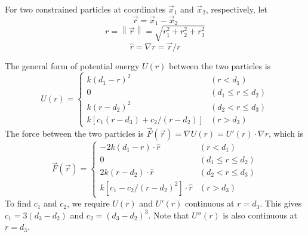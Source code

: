 \documentclass[10pt]{article}
\newcommand{\norm}[1]{\left\lVert#1\right\rVert}
\begin{document}
For two constrained particles at coordinates $\vec{x}_1$ and $\vec{x}_2$,
respectively, let
$$\vec{r}=\vec{x}_1-\vec{x}_2$$
$$r=\norm{\vec{r}}=\sqrt{r_1^2+r_2^2+r_3^2}$$
$$\hat{r}=\nabla r=\vec{r}/r$$

The general form of potential energy $U(r)$ between the two particles is
\begin{equation*}
U(r)=\left\{\begin{array}{ll}
k(d_1-r)^2 & (r < d_1) \\
0 & (d_1\le r\le d_2) \\
k(r-d_2)^2 & (d_2 < r \le d_3) \\
k[c_1(r-d_3) + c_2/(r-d_2)] & (r > d_3)
\end{array}\right.
\end{equation*}
The force between the two particles is $\vec{F}(\vec{r})=\nabla
U(r)=U'(r)\cdot\nabla r$, which is
\[
\vec{F}(\vec{r})=\left\{\begin{array}{ll}
-2k(d_1-r)\cdot\hat{r} & (r < d_1) \\
0 & (d_1\le r\le d_2) \\
2k(r-d_2)\cdot\hat{r} & (d_2 < r \le d_3) \\
k[c_1-c_2/(r-d_2)^2]\cdot\hat{r} & (r > d_3)
\end{array}\right.
\]
To find $c_1$ and $c_2$, we require $U(r)$ and $U'(r)$ continuous at
$r=d_3$. This gives $c_1=3(d_3-d_2)$ and $c_2=(d_3-d_2)^3$. Note that $U''(r)$
is also continuous at $r=d_3$.
\end{document}
